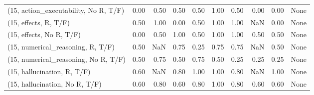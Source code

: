\begin{table*}[h!]
\begin{adjustbox}{width=2\columnwidth,center}
\begin{tabular}{lrrr|rrr|rrr}
(15, action\_executability, No R, T/F) &                      0.00 &                  0.50 &                      0.50 &                          0.50 &                      1.00 &                          0.50 &                                   0.00 &                               0.00 &                                  None \\
(15, effects, R, T/F)                 &                      0.50 &                  1.00 &                      0.00 &                          0.50 &                      1.00 &                          1.00 &                                    NaN &                               0.00 &                                  None \\
(15, effects, No R, T/F)              &                      0.00 &                  0.50 &                      1.00 &                          0.50 &                      1.00 &                          1.00 &                                   0.50 &                               0.50 &                                  None \\
(15, numerical\_reasoning, R, T/F)     &                      0.50 &                   NaN &                      0.75 &                          0.25 &                      0.75 &                          0.75 &                                    NaN &                               0.50 &                                  None \\
(15, numerical\_reasoning, No R, T/F)  &                      0.50 &                  0.75 &                      0.50 &                          0.75 &                      0.50 &                          0.25 &                                   0.25 &                               0.25 &                                  None \\
(15, hallucination, R, T/F)           &                      0.60 &                   NaN &                      0.80 &                          1.00 &                      1.00 &                          0.80 &                                    NaN &                               1.00 &                                  None \\
(15, hallucination, No R, T/F)        &                      0.60 &                  0.80 &                      0.60 &                          0.80 &                      1.00 &                          0.80 &                                   0.60 &                               0.60 &                                  None \\

\end{tabular}
\end{adjustbox}
\end{table*}
